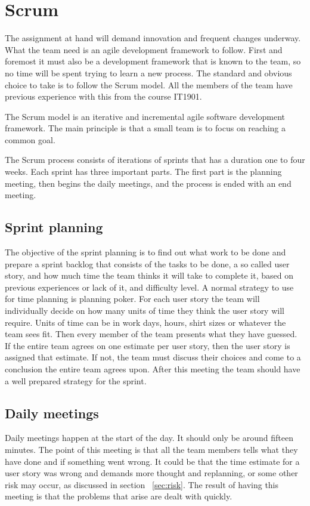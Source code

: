 \section{Scrum}

The assignment at hand will demand innovation and frequent changes underway.
What the team need is an agile development framework to follow. First and foremost it must also be a development framework that is known to the team,
so no time will be spent trying to learn a new process.
The standard and obvious choice to take is to follow the Scrum model. All the members of the team have previous experience with this from the course IT1901.

The Scrum model is an iterative and incremental agile software development framework.
The main principle is that a small team is to focus on reaching a common goal.

The Scrum process consists of iterations of sprints that has a duration one to four weeks. Each sprint has three important parts.
The first part is the planning meeting, then begins the daily  meetings, and the process is ended with an end meeting.

\subsection{Sprint planning}
The objective of the sprint planning is to find out what work to be done and prepare a
sprint backlog that consists of the tasks to be done, a so called user story, and how much time the team thinks it will take to complete it, based on previous experiences or lack of it, and difficulty level. A normal strategy to use for time planning is
planning poker. For each user story the team will individually decide on how many units of time they think the user story will require. Units of time can be in work days, hours, shirt sizes or whatever the team sees fit.
Then every member of the team presents what they have guessed. If the entire team agrees on one estimate per user story, then the user story is assigned that estimate. If not, the team must discuss their choices and come to a conclusion the entire team agrees upon.
After this meeting the team should have a well prepared strategy for the sprint.

\subsection{Daily meetings}
Daily meetings happen at the start of the day. It should only be around fifteen minutes. The point of this meeting is that all the team members tells what they have done and if something went wrong.
It could be that the time estimate for a user story was wrong and demands more thought and replanning, or some other risk may occur, as discussed in section ~\ref{sec:risk}. The result of having this meeting is that the problems that arise are dealt with quickly.


